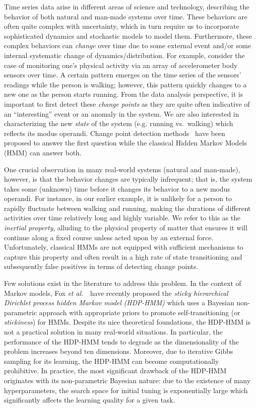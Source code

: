 \documentclass[letterpaper]{article}
\begin{document}
Time series data arise in different areas of science and technology, describing
the behavior of both natural and man-made systems over time. These
behaviors are often quite complex with uncertainty, which in turn require us to
incorporate sophisticated dynamics and stochastic models to model them.
Furthermore, these complex behaviors can \emph{change} over time due to some external event and/or some internal
systematic change of dynamics/distribution. For example, consider the case of
monitoring one's physical activity via an array of accelerometer body sensors
over time. A certain pattern emerges on the time series of the sensors' readings
while the person is walking; however, this pattern quickly changes to a new one
as the person starts running. From the data analysis perspective, it is
important to first detect these \emph{change points} as they are quite often
indicative of an ``interesting'' event or an anomaly in the system. We
are also interested in characterizing the new \emph{state} of the system (e.g. running vs.\
walking) which reflects its modus operandi. Change point detection methods~\cite{kawahara2007change,xie2013change} have been proposed
to answer the first question while the classical Hidden Markov Models (HMM) can
answer both.

One crucial observation in many real-world systems (natural and man-made),
however, is that the behavior changes are typically infrequent; that is, the
system takes some (unknown) time before it changes its behavior to a new modus operandi. For
instance, in our earlier example, it is unlikely for a person to rapidly fluctuate between
walking and running, making the durations of different
activities over time relatively long and highly variable. We refer to this as the
\emph{inertial property}, alluding to the physical property of matter that
ensures it will continue along a fixed course unless acted upon by an external
force. Unfortunately, classical HMMs are not equipped with sufficient
mechanisms to capture this property and often result in a high rate of
state transitioning and subsequently false positives in terms of detecting
change points.

Few solutions exist in the literature to address this problem. In
the context of Markov models, Fox \emph{et al.}~\cite{fox2011sticky}\ have
recently proposed the \emph{sticky hierarchical Dirichlet process hidden Markov
model (HDP-HMM)} which uses a Bayesian non-parametric approach with appropriate
priors to promote self-transitioning (or \emph{stickiness}) for HMMs. Despite its
nice theoretical foundations, the HDP-HMM is not a practical solution in many real-world situations.
In particular, the performance of the HDP-HMM tends to degrade as the
dimensionality of the problem increases beyond ten dimensions. Moreover, due to 
iterative Gibbs sampling for its learning, the HDP-HMM can become computationally prohibitive. 
In practice, the most significant drawback of the HDP-HMM originates with its non-parametric 
Bayesian nature: due to the existence of many hyperparameters, the search space for initial tuning is 
exponentially large which significantly affects the learning quality for a given task.
\end{document}
